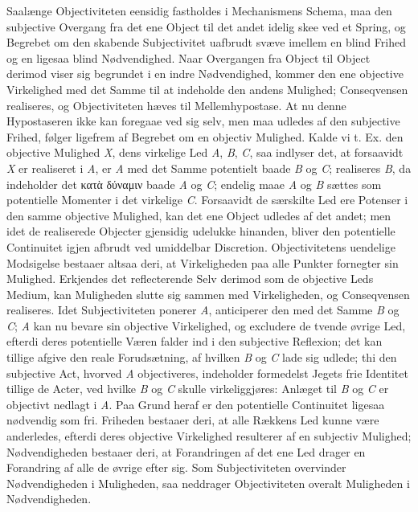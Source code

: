 \documentclass[12pt]{book}
\newcommand{\opage}[1]{\marginnote{\footnotesize\textit{[#1]}}}
\begin{document}
Saalænge Objectiviteten eensidig fastholdes i Mechanismens Schema, maa den subjective
Overgang fra det ene Object til det andet idelig skee ved et Spring, og Begrebet om den
skabende Subjectivitet uafbrudt svæve imellem en blind Frihed og en ligesaa blind
Nødvendighed. Naar Overgangen fra Object til Object derimod viser sig begrundet i en
indre Nødvendighed, kommer den ene objective Virkelighed med det Samme til at indeholde
den andens Mulighed; Conseqvensen realiseres, og Objectiviteten hæves til
Mellemhypostase. At nu denne Hypostaseren ikke kan foregaae ved sig selv, men maa
udledes af den subjective Frihed, følger ligefrem af Begrebet om en objectiv Mulighed.
Kalde vi t. Ex. den objective Mulighed \textit{X}, dens virkelige Led \textit{A},
\textit{B}, \textit{C}, saa indlyser det, at forsaavidt \textit{X} er realiseret i
\textit{A}, er \textit{A} med det Samme potentielt baade \textit{B} og \textit{C};
realiseres \textit{B}, da indeholder det κατὰ δύναμιν baade \textit{A} og \textit{C};
endelig maae \textit{A} og \textit{B} sættes som potentielle Momenter i det virkelige
\textit{C}. Forsaavidt de særskilte Led ere Potenser i den samme objective Mulighed,
\opage{214} %
%
%
%
kan det ene Object udledes af det andet; men idet de realiserede Objecter gjensidig
udelukke hinanden, bliver den potentielle Continuitet igjen afbrudt ved umiddelbar
Discretion. Objectivitetens uendelige Modsigelse bestaaer altsaa deri, at Virkeligheden
paa alle Punkter fornegter sin Mulighed. Erkjendes det reflecterende Selv derimod som de
objective Leds Medium, kan Muligheden slutte sig sammen med Virkeligheden, og
Conseqvensen realiseres. Idet Subjectiviteten ponerer \textit{A}, anticiperer den med
det Samme \textit{B} og \textit{C}; \textit{A} kan nu bevare sin objective Virkelighed,
og excludere de tvende øvrige Led, efterdi deres potentielle Væren falder ind i den
subjective Reflexion; det kan tillige afgive den reale Forudsætning, af hvilken
\textit{B} og \textit{C} lade sig udlede; thi den subjective Act, hvorved \textit{A}
objectiveres, indeholder formedelst Jegets frie Identitet tillige de Acter, ved hvilke
\textit{B} og \textit{C} skulle virkeliggjøres: Anlæget til \textit{B} og \textit{C} er
objectivt nedlagt i \textit{A}. Paa Grund heraf er den potentielle Continuitet ligesaa
nødvendig som fri. Friheden bestaaer deri, at alle Rækkens Led kunne være anderledes,
efterdi deres objective Virkelighed resulterer af en subjectiv Mulighed; Nødvendigheden
bestaaer deri, at Forandringen af det ene Led drager en Forandring af alle de øvrige
efter sig. Som Subjectiviteten overvinder Nødvendigheden i Muligheden, saa neddrager
Objectiviteten overalt Muligheden i Nødvendigheden.
\end{document}
